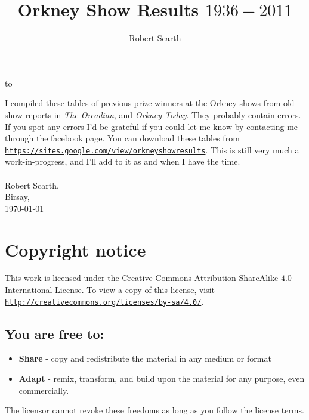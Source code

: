 \documentclass[a4paper,11pt]{report}
\title{Orkney Show Results $1936 - 2011$}
\author{Robert Scarth}
\begin{document}
	\maketitle
	\newpage
	
	\vbox to 
	
	\newpage
	
		\tableofcontents
	
	\newpage

		\listoffigures
		
	\newpage

		
	I compiled these tables of previous prize winners at the Orkney shows from old show reports in \emph{The Orcadian}, and \emph{Orkney Today}. They probably contain errors. If you spot any errors I'd be grateful if you could let me know by contacting me through the facebook page. You can download these tables from \href{https://sites.google.com/view/orkneyshowresults}{\texttt{https://sites.google.com/view/orkneyshowresults}}. This is still very much a work-in-progress, and I'll add to it as and when I have the time.\\
\\
Robert Scarth, \\
Birsay, \\
\today

\newpage
	\section*{Copyright notice}
	This work is licensed under the Creative Commons Attribution-ShareAlike $4.0$ International License. To view a copy of this license, visit \newline \href{http://creativecommons.org/licenses/by-sa/4.0/}{\texttt{http://creativecommons.org/licenses/by-sa/4.0/}}.
	
	\subsection*{You are free to:}
	\begin{itemize}
		\item \textbf{Share} - copy and redistribute the material in any medium or format
		\item \textbf{Adapt} - remix, transform, and build upon the material for any purpose, even commercially.
	\end{itemize}
	The licensor cannot revoke these freedoms as long as you follow the license terms.\\ 
\end{document}
